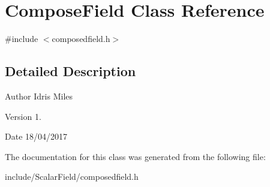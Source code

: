 \hypertarget{classComposeField}{}\section{Compose\+Field Class Reference}
\label{classComposeField}


{\ttfamily \#include $<$composedfield.\+h$>$}



\subsection{Detailed Description}
\begin{DoxyAuthor}{Author}
Idris Miles 
\end{DoxyAuthor}
\begin{DoxyVersion}{Version}
1. 
\end{DoxyVersion}
\begin{DoxyDate}{Date}
18/04/2017 
\end{DoxyDate}


The documentation for this class was generated from the following file\+:\begin{DoxyCompactItemize}
\item 
include/\+Scalar\+Field/composedfield.\+h\end{DoxyCompactItemize}
